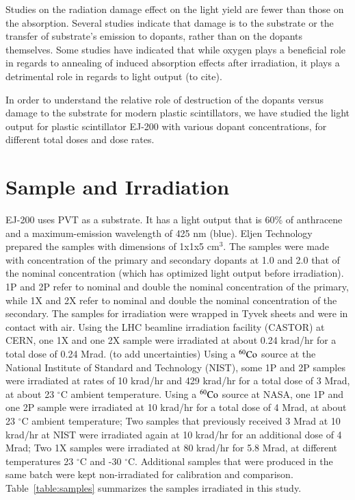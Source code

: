 \documentclass[preprint,12pt]{elsarticle}
\begin{document}
Studies on the radiation damage effect on the light yield are fewer than those on the absorption. 
Several studies indicate that damage is to the substrate or the transfer of substrate's emission to dopants, 
rather than on the dopants themselves.
Some studies have indicated that while oxygen plays a beneficial role in regards to annealing of induced absorption effects after 
irradiation, it plays a detrimental role in regards to light output (to cite). 

In order to understand the relative role of destruction of the dopants versus damage to the substrate for modern plastic scintillators, 
we have studied the light output for plastic scintillator EJ-200 with various dopant concentrations, 
for different total doses and dose rates. 

\section{Sample and Irradiation}
EJ-200 uses PVT as a substrate. It has a light output that is 60\% of anthracene and a maximum-emission wavelength of 425 nm (blue). 
Eljen Technology prepared the samples with dimensions of 1x1x5 cm$^{3}$. 
The samples were made with concentration of the primary and secondary dopants at 1.0 and 2.0 that of 
the nominal concentration (which has optimized light output before irradiation). 
1P and 2P refer to nominal and double the nominal concentration of the primary, 
while 1X and 2X refer to nominal and double the nominal concentration of the secondary.
The samples for irradiation were wrapped in Tyvek sheets and were in contact with air.
Using the LHC beamline irradiation facility (CASTOR) at CERN, 
one 1X and one 2X sample were irradiated at about 0.24 krad/hr for a total dose of 0.24 Mrad. (to add uncertainties) 
Using a $\rm {^{60}Co}$ source at the National Institute of Standard and Technology (NIST), some 1P and 2P samples were irradiated  
at rates of 10 krad/hr and 429 krad/hr for a total dose of 3 Mrad, at about 23 $^\circ$C ambient temperature.  
Using a $\rm {^{60}Co}$ source at NASA, one 1P and one 2P sample were irradiated  
at 10 krad/hr for a total dose of 4 Mrad, at about 23 $^\circ$C ambient temperature; 
Two samples that previously received 3 Mrad at 10 krad/hr at NIST were irradiated again at 10 krad/hr for an additional dose of 4 Mrad;
Two 1X samples were irradiated at 80 krad/hr for 5.8 Mrad, at different temperatures 23 $^\circ$C and -30 $^\circ$C.
Additional samples that were produced in the same batch were kept non-irradiated for calibration and comparison.
Table~\ref{table:samples} summarizes the samples irradiated in this study.
\end{document}
